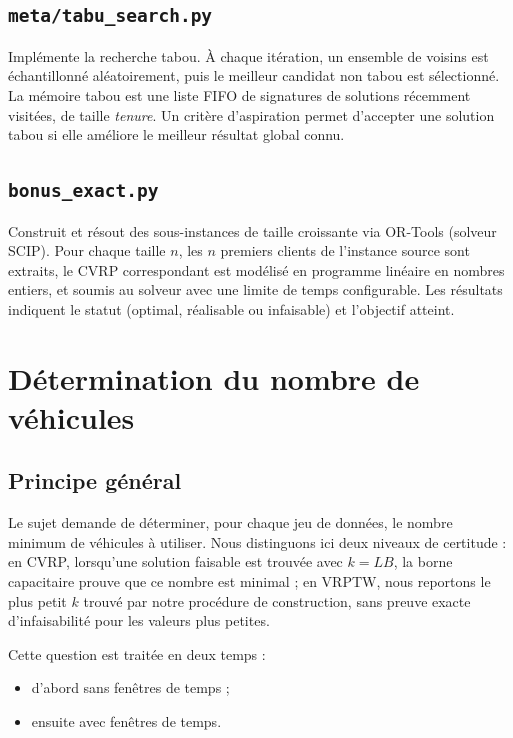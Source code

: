 \documentclass[11pt,a4paper]{article}
\begin{document}
\subsection{\texttt{meta/tabu\_search.py}}
Implémente la recherche tabou. À chaque itération, un ensemble de voisins est échantillonné aléatoirement, puis le meilleur candidat non tabou est sélectionné. La mémoire tabou est une liste FIFO de signatures de solutions récemment visitées, de taille \textit{tenure}. Un critère d'aspiration permet d'accepter une solution tabou si elle améliore le meilleur résultat global connu.

\subsection{\texttt{bonus\_exact.py}}
Construit et résout des sous-instances de taille croissante via OR-Tools (solveur SCIP). Pour chaque taille \(n\), les \(n\) premiers clients de l'instance source sont extraits, le CVRP correspondant est modélisé en programme linéaire en nombres entiers, et soumis au solveur avec une limite de temps configurable. Les résultats indiquent le statut (optimal, réalisable ou infaisable) et l'objectif atteint.

\section{Détermination du nombre de véhicules}
\label{sec:det_vehicules}

\subsection{Principe général}
Le sujet demande de déterminer, pour chaque jeu de données, le nombre minimum de véhicules à utiliser. Nous distinguons ici deux niveaux de certitude : en CVRP, lorsqu'une solution faisable est trouvée avec \(k=LB\), la borne capacitaire prouve que ce nombre est minimal ; en VRPTW, nous reportons le plus petit \(k\) trouvé par notre procédure de construction, sans preuve exacte d'infaisabilité pour les valeurs plus petites.

Cette question est traitée en deux temps :
\begin{itemize}
    \item d'abord sans fenêtres de temps ;
    \item ensuite avec fenêtres de temps.
\end{itemize}
\end{document}
